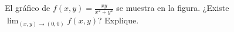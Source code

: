 \item El gráfico de $f(x,y) = \frac{xy}{x^2+y^2}$ se muestra en la figura. ¿Existe $\lim_{(x,y) \to (0,0)} f(x,y)$? Explique.
